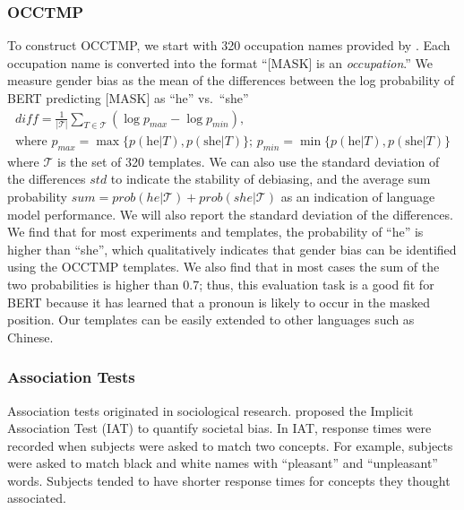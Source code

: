 \subsubsection{OCCTMP}
\label{sec:occtmp}
To construct OCCTMP, we start with 320 occupation names %
provided by . Each occupation name is converted into the format ``[MASK] is an \textit{occupation}.''
We measure gender bias as the mean of the differences between the log probability of BERT predicting [MASK] as ``he'' vs.\ ``she''
\begin{gather*}
\textit{diff}=\frac{1}{|{\mathcal T}|} \sum_{T \in
	{\mathcal T}}(\log p_{max} - \log p_{min}),\\
\mbox{where }p_{max}=\max\{p(\mbox{he}| T),p(\mbox{she}| T)\} \mbox{; }p_{min}=\min\{p(\mbox{he}| T),p(\mbox{she}| T)\}
\end{gather*}
where $\mathcal T$ is the set of 320 templates. We can also use the standard deviation of the differences $std$ to indicate the stability of debiasing, and the average sum probability $sum=prob(he|{\mathcal T})+prob(she|{\mathcal T})$ as an indication of language model performance. 
We will also report the standard deviation of the differences. We find that for most experiments and templates, the probability of
``he'' is higher than ``she'', which qualitatively indicates
that gender bias can be identified using the OCCTMP templates. We also find that in most cases the sum of the two probabilities is higher than 0.7; thus, this evaluation task is a good fit for BERT because it has learned that a pronoun is likely to occur in the masked position. Our templates can be easily extended to other languages such as Chinese.

\subsubsection{Association Tests}\label{sec:weat}
Association tests originated in sociological research.  proposed the Implicit Association Test (IAT) to quantify societal bias. In IAT, response times were recorded when subjects were asked to match two concepts. For example, subjects were asked to match black and white names with “pleasant” and “unpleasant” words. Subjects tended to have shorter response times for concepts they thought associated. 

